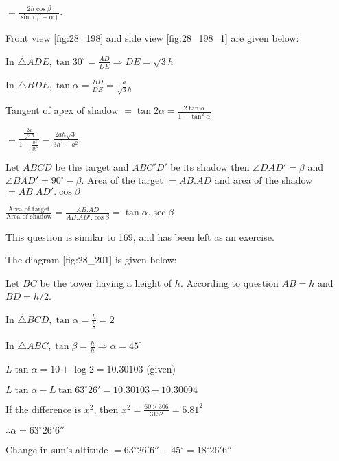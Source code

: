   $= \frac{2h\cos\beta}{\sin(\beta - \alpha)}$.

\item Front view [fig:28_198] and side view [fig:28_198_1] are given below:

  \startplacefigure[reference=fig:28_198]
    \externalfigure[28_198.pdf]
  \stopplacefigure
  \startplacefigure[reference=fig:28_198_1]
    \externalfigure[28_198_1.pdf]
  \stopplacefigure

  In $\triangle ADE, \tan30^\circ = \frac{AD}{DE} \Rightarrow DE = \sqrt{3}h$

  In $\triangle BDE, \tan\alpha = \frac{BD}{DE} = \frac{a}{\sqrt{3}h}$

  Tangent of apex of shadow $= \tan2\alpha = \frac{2\tan\alpha}{1 - \tan^2\alpha}$

  $= \frac{\frac{2a}{\sqrt{3}h}}{1 - \frac{a^2}{3h^2}} = \frac{2ah\sqrt{3}}{3h^2 - a^2}$.

\item Let $ABCD$ be the target and $ABC'D'$ be its shadow then $\angle DAD' = \beta$ and
  $\angle BAD'= 90^\circ - \beta$. Area of the target $= AB.AD$ and area of the shadow
  $= AB.AD'.\cos\beta$

  $\frac{\text{Area of target}}{\text{Area of shadow}} = \frac{AB.AD}{AB.AD'.\cos\beta} =
  \tan\alpha.\sec\beta$

\item This question is similar to 169, and has been left as an exercise.
\item The diagram [fig:28_201] is given below:

  \startplacefigure[reference=fig:28_201]
    \externalfigure[28_201.pdf]
  \stopplacefigure

  Let $BC$ be the tower having a height of $h$. According to question $AB = h$ and $BD = h/2$.

  In $\triangle BCD, \tan\alpha = \frac{h}{\frac{h}{2}} = 2$

  In $\triangle ABC, \tan\beta = \frac{h}{h} \Rightarrow \alpha = 45^\circ$

  $L\tan\alpha = 10 + \log 2 = 10.30103$ (given)

  $L\tan\alpha - L\tan63^\circ26'= 10.30103 - 10.30094$

  If the difference is $x^2$, then $x^2 = \frac{60\times306}{3152} = 5.81^2$

  $\therefore \alpha = 63^\circ26'6''$

  Change in sun's altitude $= 63^\circ26'6'' - 45^\circ = 18^\circ26'6''$

